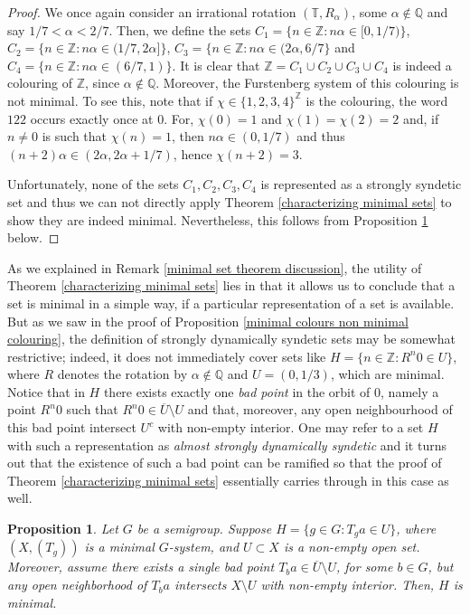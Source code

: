 \documentclass{amsart}
\numberwithin{equation}{section}
\newtheorem{proposition}[lemma]{Proposition}
\theoremstyle{definition}
\theoremstyle{plain}
\newcommand{\Q}{{\mathbb Q}}
\newcommand{\T}{{\mathbb T}}
\newcommand{\Z}{{\mathbb Z}}
\begin{document}
\begin{proof}
We once again consider an irrational rotation 
$(\T,R_{\alpha})$, some $\alpha \notin \Q$ and say 
$1/7<\alpha<2/7$. Then, we define the 
sets $C_1=\{n\in \Z: n\alpha\in [0,1/7)\}$, $C_2=\{n\in \Z: n\alpha\in (1/7,2\alpha]\}$, $C_3=\{n\in \Z: n\alpha\in (2\alpha, 6/7\}$ and $C_4=\{n\in \Z:n\alpha\in (6/7,1)\}$. It is clear that $\Z=C_1\cup C_2 \cup C_3 \cup C_4$ is indeed a colouring of $\Z$, since $\alpha \notin \Q$. Moreover, the Furstenberg system of this colouring is not minimal. To see this, note that if $\chi \in \{1,2,3,4\}^{\Z}$ is the colouring, the word $122$ occurs exactly once at $0$. For, $\chi(0)=1$ and $\chi(1)=\chi(2)=2$ and, if $n\neq 0$ is such that $\chi(n)=1$, then $n\alpha \in (0,1/7)$ and thus $(n+2)\alpha \in (2\alpha,2\alpha+1/7)$, hence $\chi(n+2)=3$.

Unfortunately, none of the sets $C_1,C_2,C_3,C_4$ is 
represented as a strongly syndetic set and thus we can 
not directly apply Theorem \ref{characterizing minimal sets} to show they are indeed minimal. Nevertheless, this follows from Proposition \ref{characterizing minimal sets stronger} below. 
\end{proof}

As we explained in Remark 
\ref{minimal set theorem discussion}, the utility of Theorem \ref{characterizing minimal sets} lies in that it allows us to conclude that a set is minimal in a simple way, if a particular representation of a set is available. But as we saw in the proof of Proposition \ref{minimal colours non minimal colouring}, the definition of strongly dynamically syndetic sets may be somewhat restrictive; indeed, it does not immediately cover sets like $H=\{n\in \Z: R^n0\in U\}$, where $R$ denotes the rotation by $\alpha \notin \Q$ and $U=(0,1/3)$, which are minimal. Notice that in $H$ there exists exactly one \textit{bad point} in the orbit of $0$, namely a point $R^n0$ such that $R^n0\in \overline{U}\setminus U$ and that, moreover, any open neighbourhood of this bad point intersect $U^{c}$ with non-empty interior. One may refer to a set $H$ with such a representation as \textit{almost strongly dynamically syndetic} and it turns out that the existence of such a bad point can be ramified so that the proof of Theorem \ref{characterizing minimal sets} essentially carries through in this case as well. 

\begin{proposition}\label{characterizing minimal sets stronger}
Let $G$ be a semigroup. Suppose $H=\{g\in G: T_ga\in U\}$, where $(X,(T_g))$ is a minimal $G$-system, and $U\subset X$ is a non-empty open set. Moreover, assume there exists a single bad point $T_ba\in \overline{U}\setminus U$, for some $b\in G$, but any open neighborhood of $T_ba$ intersects $X\setminus U$ with non-empty interior. Then, $H$ is minimal.    
\end{proposition}
\end{document}
